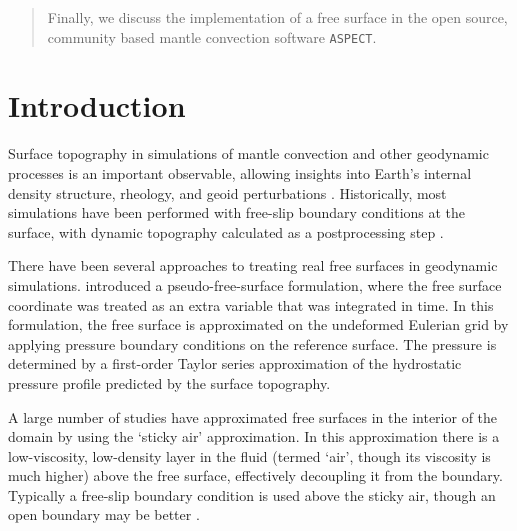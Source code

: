 \documentclass[preprint,12pt,authoryear]{elsarticle}
\begin{document}
\begin{frontmatter}
\begin{abstract}
Finally, we discuss the implementation of a free surface in the open source, community based
mantle convection software \texttt{ASPECT}.
\end{abstract}

\begin{keyword}



\end{keyword}

\end{frontmatter}


\section{Introduction}
\label{sec:intro}

Surface topography in simulations of mantle convection and other geodynamic processes is an important observable,
allowing insights into Earth's internal density structure, rheology, and geoid perturbations \citep[e.g.][]{richards1984geoid, hager1985lower, baumann2014constraining}.
Historically, most simulations have been performed with free-slip boundary conditions at the surface, 
with dynamic topography calculated as a postprocessing step \citep[e.g.][]{zhong2000role}.

There have been several approaches to treating real free surfaces in geodynamic simulations.
\citet{zhong1996free} introduced a pseudo-free-surface formulation, where the free surface coordinate was
treated as an extra variable that was integrated in time. In this formulation, the free surface 
is approximated on the undeformed Eulerian grid by applying pressure boundary conditions on the reference surface.
The pressure is determined by a first-order Taylor series approximation of the hydrostatic pressure profile 
predicted by the surface topography.

A large number of studies have approximated free surfaces in the interior of the domain by using the 
`sticky air' approximation. In this approximation there is a low-viscosity, low-density layer in the fluid 
(termed `air', though its viscosity is much higher) above the free surface, effectively decoupling it from the boundary. 
Typically a free-slip boundary condition is used above the sticky air, though an open boundary may be better \citep{hillebrand2014using}. 
\end{document}
